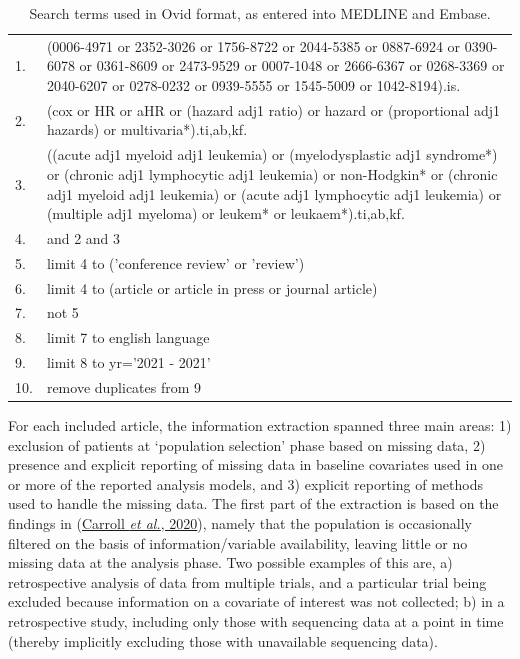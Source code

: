 \documentclass[
  letterpaper,
  DIV=11,
  numbers=noendperiod]{scrreprt}
\begin{document}
\hypertarget{tbl-ovid-search}{}
\begin{table}
\caption{\label{tbl-ovid-search}Search terms used in Ovid format, as entered into MEDLINE and Embase. }\tabularnewline

\centering
\begin{tabular}[t]{l>{\raggedright\arraybackslash}p{35em}}
\toprule
 & \\
\midrule
1. & (0006-4971 or 2352-3026 or 1756-8722 or 2044-5385 or 0887-6924 or 0390-6078 or 0361-8609 or 2473-9529 or 0007-1048 or 2666-6367 or 0268-3369 or 2040-6207 or 0278-0232 or 0939-5555 or 1545-5009 or 1042-8194).is.\\
2. & (cox or HR or aHR or (hazard adj1 ratio) or hazard or (proportional adj1 hazards) or multivaria*).ti,ab,kf.\\
3. & ((acute adj1 myeloid adj1 leukemia) or (myelodysplastic adj1 syndrome*) or (chronic adj1 lymphocytic adj1 leukemia) or non-Hodgkin* or (chronic adj1 myeloid adj1 leukemia) or (acute adj1 lymphocytic adj1 leukemia) or (multiple adj1 myeloma) or leukem* or leukaem*).ti,ab,kf.\\
4. & 1 and 2 and 3\\
5. & limit 4 to ('conference review' or 'review')\\
6. & limit 4 to (article or article in press or journal article)\\
7. & 6 not 5\\
8. & limit 7 to english language\\
9. & limit 8 to yr='2021 - 2021'\\
10. & remove duplicates from 9\\
\bottomrule
\end{tabular}
\end{table}

For each included article, the information extraction spanned three main
areas: 1) exclusion of patients at `population selection' phase based on
missing data, 2) presence and explicit reporting of missing data in
baseline covariates used in one or more of the reported analysis models,
and 3) explicit reporting of methods used to handle the missing data.
The first part of the extraction is based on the findings in
(\protect\hyperlink{ref-carrollHowAreMissing2020}{Carroll \emph{et al.},
2020}), namely that the population is occasionally filtered on the basis
of information/variable availability, leaving little or no missing data
at the analysis phase. Two possible examples of this are, a)
retrospective analysis of data from multiple trials, and a particular
trial being excluded because information on a covariate of interest was
not collected; b) in a retrospective study, including only those with
sequencing data at a point in time (thereby implicitly excluding those
with unavailable sequencing data).
\end{document}
